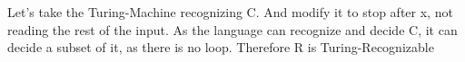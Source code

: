 

Let's take the Turing-Machine recognizing C. And modify it to stop after x, not reading the rest of the input. As the language can recognize and decide C, it can decide a subset of it, as there is no loop. Therefore R is Turing-Recognizable